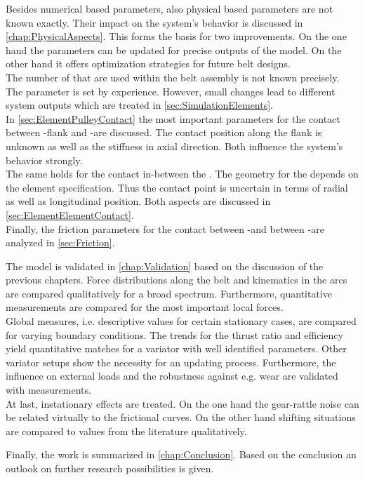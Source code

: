 Besides numerical based parameters, also physical based parameters are not known exactly.
Their impact on the system's behavior is discussed in \cref{chap:PhysicalAspects}.
This forms the basis for two improvements.
On the one hand the parameters can be updated for precise outputs of the model.
On the other hand it offers optimization strategies for future belt designs.\\
The number of \els that are used within the belt assembly is not known precisely.
The parameter is set by experience.
However, small changes lead to different system outputs which are treated in \cref{sec:SimulationElements}.\\
In \cref{sec:ElementPulleyContact} the most important parameters for the contact between \el-flank and \pulley-\sheave are discussed.
The contact position along the flank is unknown as well as the stiffness in axial direction.
Both influence the system's behavior strongly.\\
The same holds for the contact in-between the \els.
The geometry for the \head depends on the element specification.
Thus the contact point is uncertain in terms of radial as well as longitudinal position.
Both aspects are discussed in \cref{sec:ElementElementContact}.\\
Finally, the friction parameters for the contact between \el-\pulley and between \el-\ring are analyzed in \cref{sec:Friction}.\par

The model is validated in \cref{chap:Validation} based on the discussion of the previous chapters.
Force distributions along the belt and kinematics in the arcs are compared qualitatively for a broad spectrum.
Furthermore, quantitative measurements are compared for the most important local forces.\\
Global measures, i.e. descriptive values for certain stationary cases, are compared for varying boundary conditions.
The trends for the thrust ratio and efficiency yield quantitative matches for a variator with well identified parameters.
Other variator setups show the necessity for an updating process.
Furthermore, the influence on external loads and the robustness against e.g. wear are validated with measurements.\\
At last, instationary effects are treated.
On the one hand the gear-rattle noise can be related virtually to the frictional curves.
On the other hand shifting situations are compared to values from the literature qualitatively.\par

Finally, the work is summarized in \cref{chap:Conclusion}.
Based on the conclusion an outlook on further research possibilities is given.
